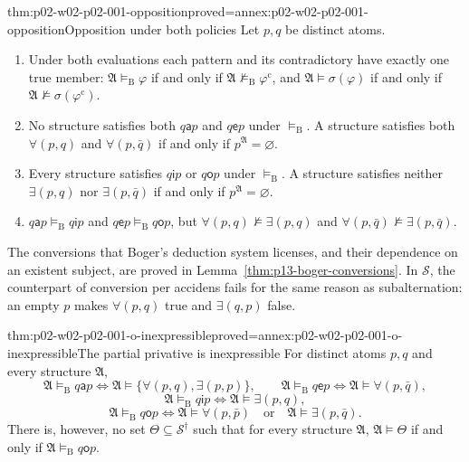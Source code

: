 \begin{hbtheorem}{thm:p02-w02-p02-001-opposition}{proved=annex:p02-w02-p02-001-opposition}{Opposition under both policies}
Let \(p,q\) be distinct atoms.
\begin{enumerate}
\item Under both evaluations each pattern and its contradictory have
 exactly one true member: \(\mathfrak A\models_{\mathrm B}\varphi\) if and
 only if \(\mathfrak A\not\models_{\mathrm B}\varphi^{\mathrm c}\), and
 \(\mathfrak A\models\sigma(\varphi)\) if and only if
 \(\mathfrak A\not\models\sigma(\varphi^{\mathrm c})\).
\item No structure satisfies both \(q\mathbin{\mathsf a}p\) and
 \(q\mathbin{\mathsf e}p\) under \(\models_{\mathrm B}\). A structure
 satisfies both \(\forall(p,q)\) and \(\forall(p,\bar q)\) if and only if
 \(p^{\mathfrak A}=\varnothing\).
\item Every structure satisfies \(q\mathbin{\mathsf i}p\) or
 \(q\mathbin{\mathsf o}p\) under \(\models_{\mathrm B}\). A structure
 satisfies neither \(\exists(p,q)\) nor \(\exists(p,\bar q)\) if and only if
 \(p^{\mathfrak A}=\varnothing\).
\item \(q\mathbin{\mathsf a}p\models_{\mathrm B}q\mathbin{\mathsf i}p\) and
 \(q\mathbin{\mathsf e}p\models_{\mathrm B}q\mathbin{\mathsf o}p\), but
 \(\forall(p,q)\not\models\exists(p,q)\) and
 \(\forall(p,\bar q)\not\models\exists(p,\bar q)\).
\end{enumerate}
\end{hbtheorem}

The conversions that Boger's deduction system licenses, and their dependence
on an existent subject, are proved in
Lemma~\ref{thm:p13-boger-conversions}. In \(\mathcal S\), the
counterpart of conversion per accidens fails for the same reason as
subalternation: an empty \(p\) makes \(\forall(p,q)\) true and
\(\exists(q,p)\) false.

\begin{hbtheorem}{thm:p02-w02-p02-001-o-inexpressible}{proved=annex:p02-w02-p02-001-o-inexpressible}{The partial privative is inexpressible}
For distinct atoms \(p,q\) and every structure \(\mathfrak A\),
\[
 \mathfrak A\models_{\mathrm B}q\mathbin{\mathsf a}p\iff
 \mathfrak A\models\{\forall(p,q),\exists(p,p)\},\qquad
 \mathfrak A\models_{\mathrm B}q\mathbin{\mathsf e}p\iff
 \mathfrak A\models\forall(p,\bar q),
\]
\[
 \mathfrak A\models_{\mathrm B}q\mathbin{\mathsf i}p\iff
 \mathfrak A\models\exists(p,q),
\]
\[
 \mathfrak A\models_{\mathrm B}q\mathbin{\mathsf o}p\iff
 \mathfrak A\models\forall(p,\bar p)\quad\text{or}\quad
 \mathfrak A\models\exists(p,\bar q).
\]
There is, however, no set \(\Theta\subseteq\mathcal S^\dagger\) such that
for every structure \(\mathfrak A\),
\(\mathfrak A\models\Theta\) if and only if
\(\mathfrak A\models_{\mathrm B}q\mathbin{\mathsf o}p\).
\end{hbtheorem}

